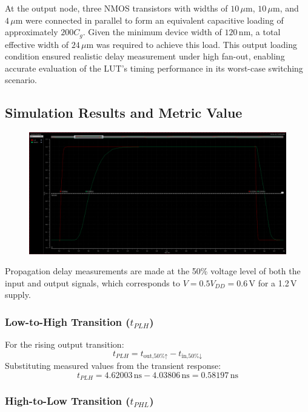 \documentclass[12pt]{article}
\begin{document}
At the output node, three NMOS transistors with widths of \(10\,\mu\text{m}\), \(10\,\mu\text{m}\), and \(4\,\mu\text{m}\) were connected in parallel to form an equivalent capacitive loading of approximately \(200C_g\). 
Given the minimum device width of \(120\,\text{nm}\), a total effective width of \(24\,\mu\text{m}\) was required to achieve this load. 
This output loading condition ensured realistic delay measurement under high fan-out, enabling accurate evaluation of the LUT’s timing performance in its worst-case switching scenario.

\newpage

\subsection{Simulation Results and Metric Value}
\begin{figure}[H]
    \centering
    \includegraphics[width=\linewidth]{writeup//figures/baselinedelay.png}
    \caption{}
\end{figure}
Propagation delay measurements are made at the 50\% voltage level of both the input and output signals, which corresponds to \( V = 0.5V_{DD} = 0.6\,\text{V} \) for a 1.2\,V supply.

\subsubsection*{Low-to-High Transition (\(t_{PLH}\))}

For the rising output transition:
\[
t_{PLH} = t_{\text{out,50\%↑}} - t_{\text{in,50\%↓}}
\]
Substituting measured values from the transient response:
\[
t_{PLH} = 4.62003\,\text{ns} - 4.03806\,\text{ns} = 0.58197\,\text{ns}
\]

\subsubsection*{High-to-Low Transition (\(t_{PHL}\))}
\end{document}
